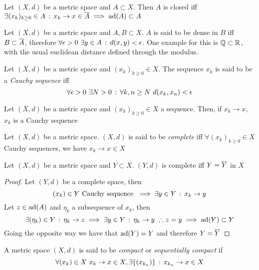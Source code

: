 \documentclass[../complete.tex]{subfiles}
\begin{document}
\begin{prop}
	Let $(X,d)$ be a metric space and $A\subset X$. Then $A$ is closed iff $\exists(x_k)_{k\ge0}\in A\, :\,  x_k\to x\in\overline{A}\implies\operatorname{ad}(A)\subset A$
\end{prop}
\begin{dfn}
	Let $(X,d)$ be a metric space and $A,B\subset X$. $A$ is said to be dense in $B$ iff $B\subset\overline{A}$, therefore $\forall\epsilon>0\ \exists y\in A\, :\,  d(x,y)<\epsilon$. One example for this is $\mathbb{Q}\subset\mathbb{R}$, with the usual euclidean distance defined through the modulus.
\end{dfn}
\begin{dfn}
	Let $(X,d)$ be a metric space and $(x_k)_{k\ge0}\in X$. The sequence $x_k$ is said to be a \textit{Cauchy sequence} iff
	\begin{equation*}
		\forall\epsilon>0\ \exists N>0\, :\, \forall k,n\ge N\ d(x_k,x_n)<\epsilon
	\end{equation*}
\end{dfn}
\begin{prop}
	Let $(X,d)$ be a metric space and $(x_k)_{k\ge0}\in X$ a sequence. Then, if $x_k\to x$, $x_k$ is a Cauchy sequence
\end{prop}
\begin{dfn}
	Let $(X,d)$ be a metric space. $(X,d)$ is said to be \textit{complete} iff $\forall(x_k)_{k\ge0}\in X$ Cauchy sequences, we have $x_k\to x\in X$
\end{dfn}
\begin{thm}[Completeness]
	Let $(X,d)$ be a metric space and $Y\subset X$. $(Y,d)$ is complete iff $Y=\overline{Y}$ in $X$
\end{thm}
\begin{proof}
	Let $(Y,d)$ be a complete space, then
	\begin{equation*}
		(x_k)\in Y\text{ Cauchy sequence }\implies\exists y\in Y\, :\,  x_k\to y
	\end{equation*}
	Let $z\in\operatorname{ad}(A)$ and $\eta_k$ a subsequence of $x_k$, then
	\begin{equation*}
		\exists(\eta_k)\in Y\, :\, \eta_k\to z\implies\exists y\in Y\, :\, \eta_k\to y\ \therefore z=y\implies \operatorname{ad}(Y)\subset Y
	\end{equation*}
	Going the opposite way we have that $\operatorname{ad}(Y)=Y$ and therefore $Y=\overline{Y}$
\end{proof}
\begin{dfn}
	A metric space $(X,d)$ is said to be \textit{compact} or \textit{sequentially compact} if
	\begin{equation*}
		\forall(x_k)\in X\ x_k\to x\in X, \exists\{(x_{k_n})\}\, :\,  x_{k_n}\to x\in X
	\end{equation*}
\end{dfn}
\end{document}
